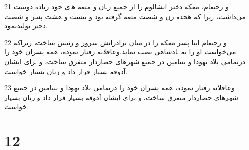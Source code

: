 \par 21 و رحبعام، معکه دختر ابشالوم را از جمیع زنان و متعه های خود زیاده دوست می‌داشت، زیرا که هجده زن و شصت متعه گرفته بود و بیست و هشت پسر و شصت دختر تولیدنمود.
\par 22 و رحبعام ابیا پسر معکه را در میان برادرانش سرور و رئیس ساخت، زیراکه می‌خواست او را به پادشاهی نصب نماید.وعاقلانه رفتار نموده، همه پسران خود را درتمامی بلاد یهودا و بنیامین در جمیع شهرهای حصاردار متفرق ساخت، و برای ایشان آذوقه بسیار قرار داد و زنان بسیار خواست.
\par 23 وعاقلانه رفتار نموده، همه پسران خود را درتمامی بلاد یهودا و بنیامین در جمیع شهرهای حصاردار متفرق ساخت، و برای ایشان آذوقه بسیار قرار داد و زنان بسیار خواست.
 
\chapter{12}

